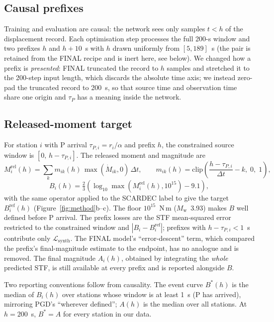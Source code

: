 \documentclass[12pt,letterpaper]{article}
\newcommand{\Mw}{M_{\mathrm{w}}}
\newcommand{\Mdot}{\dot{M}}
\begin{document}
\subsection{Causal prefixes}

Training and evaluation are causal: the network sees only samples $t<h$ of the displacement record. Each optimisation step processes the full 200-s window and two prefixes $h$ and $h+10$~s with $h$ drawn uniformly from $[5,189]$~s (the pair is retained from the FINAL recipe and is inert here, see below). We changed how a prefix is \emph{presented}: FINAL truncated the record to $h$ samples and stretched it to the 200-step input length, which discards the absolute time axis; we instead zero-pad the truncated record to 200~s, so that source time and observation time share one origin and $\tau_P$ has a meaning inside the network.

\subsection{Released-moment target}

For station $i$ with P arrival $\tau_{P,i}=r_i/\alpha$ and prefix $h$, the constrained source window is $[0,\,h-\tau_{P,i}]$. The released moment and magnitude are
\begin{equation}
M^{\mathrm{rel}}_i(h)=\sum_{k} m_{ik}(h)\,\max(\Mdot_{ik},0)\,\Delta t,\qquad
m_{ik}(h)=\mathrm{clip}\!\left(\frac{h-\tau_{P,i}}{\Delta t}-k,\;0,\;1\right),
\end{equation}
\begin{equation}
B_i(h)=\tfrac{2}{3}\left(\log_{10}\max\!\left(M^{\mathrm{rel}}_i(h),10^{15}\right)-9.1\right),
\end{equation}
with the same operator applied to the SCARDEC label to give the target $B^{\mathrm{ref}}_i(h)$ (Figure~\ref{fig:method}b--c). The floor $10^{15}$~N\,m ($\Mw$~3.93) makes $B$ well defined before P arrival. The prefix losses are the STF mean-squared error restricted to the constrained window and $|B_i-B^{\mathrm{ref}}_i|$; prefixes with $h-\tau_{P,i}<1$~s contribute only $\mathcal{L}_\mathrm{synth}$. The FINAL model's ``error-descent'' term, which compared the prefix's final-magnitude estimate to the endpoint, has no analogue and is removed. The final magnitude $A_i(h)$, obtained by integrating the \emph{whole} predicted STF, is still available at every prefix and is reported alongside $B$.

Two reporting conventions follow from causality. The event curve $B^*(h)$ is the median of $B_i(h)$ over stations whose window is at least 1~s (P has arrived), mirroring PGD's ``wherever defined''; $A(h)$ is the median over all stations. At $h=200$~s, $B^*=A$ for every station in our data.
\end{document}
